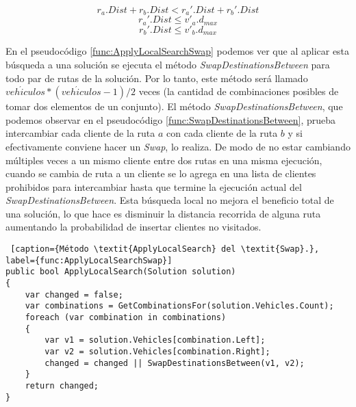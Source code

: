 \begin{equation}\label{eq:swap1}
r_a.Dist + r_b.Dist < r_a'.Dist + r_b'.Dist
\end{equation} 
\begin{equation}\label{eq:swap2}
r_a'.Dist \leq v'_a.d_{max}
\end{equation} 
\begin{equation}\label{eq:swap3}
r_b'.Dist \leq v'_b.d_{max}
\end{equation} 

\bigskip

En el pseudocódigo \ref{func:ApplyLocalSearchSwap} podemos ver que al aplicar esta búsqueda a una solución se ejecuta el método \textit{SwapDestinationsBetween} para todo par de rutas de la solución. Por lo tanto, este método será llamado $veh\acute{i}culos * (veh\acute{i}culos-1) / 2$ veces (la cantidad de combinaciones posibles de tomar dos elementos de un conjunto). El método \textit{SwapDestinationsBetween}, que podemos observar en el pseudocódigo \ref{func:SwapDestinationsBetween}, prueba intercambiar cada cliente de la ruta $a$ con cada cliente de la ruta $b$ y si efectivamente conviene hacer un \textit{Swap}, lo realiza. De modo de no estar cambiando múltiples veces a un mismo cliente entre dos rutas en una misma ejecución, cuando se cambia de ruta a un cliente se lo agrega en una lista de clientes prohibidos para intercambiar hasta que termine la ejecución actual del \textit{SwapDestinationsBetween}. Esta búsqueda local no mejora el beneficio total de una solución, lo que hace es disminuir la distancia recorrida de alguna ruta aumentando la probabilidad de insertar clientes no visitados.

\bigskip

\begin{minipage}{\textwidth}
\begin{lstlisting} [caption={Método \textit{ApplyLocalSearch} del \textit{Swap}.}, label={func:ApplyLocalSearchSwap}]
public bool ApplyLocalSearch(Solution solution)
{
	var changed = false;
	var combinations = GetCombinationsFor(solution.Vehicles.Count);
	foreach (var combination in combinations)
	{
		var v1 = solution.Vehicles[combination.Left];
		var v2 = solution.Vehicles[combination.Right];
		changed = changed || SwapDestinationsBetween(v1, v2);
	}
	return changed;
}
\end{lstlisting}
\end{minipage}

